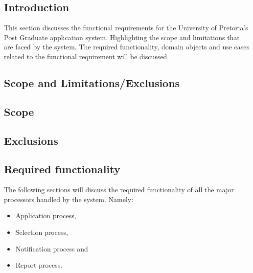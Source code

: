 \documentclass[12pt]{article}
\begin{document}
		\subsection{Introduction} %
		\vspace{0.2in}
		This section discusses the functional requirements for the University of Pretoria's Post Graduate application system. Highlighting the scope and limitations that are faced by the system. \linebreak \linebreak
		The required functionality, domain objects and use cases related to the functional requirement will be discussed. 
		\vspace{0.2in}
		
		\subsection{Scope and Limitations/Exclusions} %
		\vspace{0.2in}
		\subsection{Scope}
		\vspace{0.2in}
		
		\vspace{0.2in}
		\subsection{Exclusions}
		\vspace{0.2in}
		
		\vspace{0.2in}
		
		\subsection{Required functionality} %
		\vspace{0.2in}
		The following sections will discuss the required functionality of all the major processors handled by the system. Namely:
		\begin{itemize}
			\item Application process,
			\item Selection process,
			\item Notification process and
			\item Report process.
		\end{itemize}
\end{document}
